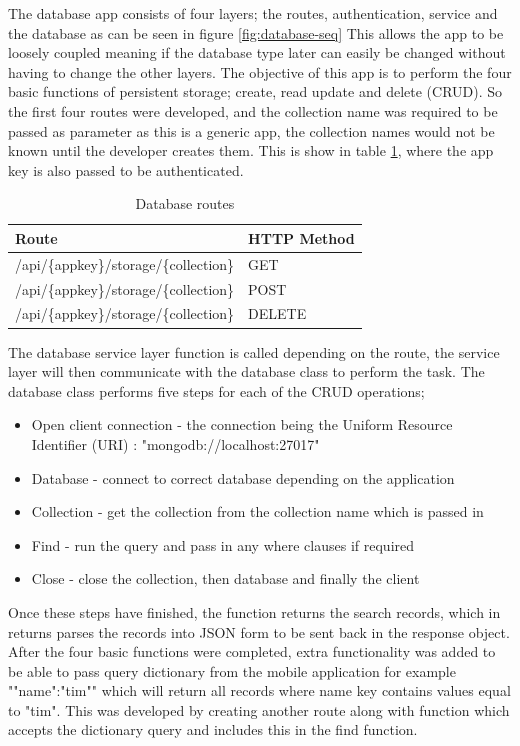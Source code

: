The database app consists of four layers; the routes, authentication, service and the database as can be seen in figure \ref{fig:database-seq} This allows the app to be loosely coupled meaning if the database type later can easily be changed without having to change the other layers. The objective of this app is to perform the four basic functions of persistent storage; create, read update and delete (CRUD). So the first four routes were developed, and the collection name was required to be passed as parameter as this is a generic app, the collection names would not be known until the developer creates them. This is show in table \ref{tb:db-routes}, where the app key is also passed to be authenticated. 

\begin{table}[!h]
\centering
\caption{Database routes}
\label{tb:db-routes}
\begin{tabular}{|l|l|}
\hline
\rowcolor{green!20}
Route                                  & HTTP Method \\ \hline
/api/\{appkey\}/storage/\{collection\} & GET         \\ \hline
/api/\{appkey\}/storage/\{collection\} & POST        \\ \hline
/api/\{appkey\}/storage/\{collection\} & DELETE      \\ \hline
\end{tabular}
\end{table}

The database service layer function is called depending on the route, the service layer will then communicate with the database class to perform the task. The database class performs five steps for each of the CRUD operations;

\begin{itemize}
  \item Open client connection
  - the connection being the Uniform Resource Identifier (URI) : "mongodb://localhost:27017" 
  \item Database 
  - connect to correct database depending on the application
  \item Collection
  - get the collection from the collection name which is passed in
  \item Find
  - run the query and pass in any where clauses if required
  \item Close
  - close the collection, then database and finally the client
\end{itemize}

Once these steps have finished, the function returns the search records, which in returns parses the records into JSON form to be sent back in the response object. After the four basic functions were completed, extra functionality was added to be able to pass query dictionary from the mobile application for example "{"name":"tim"}" which will return all records where name key contains values equal to "tim". This was developed by creating another route along with function which accepts the dictionary query and includes this in the find function.

